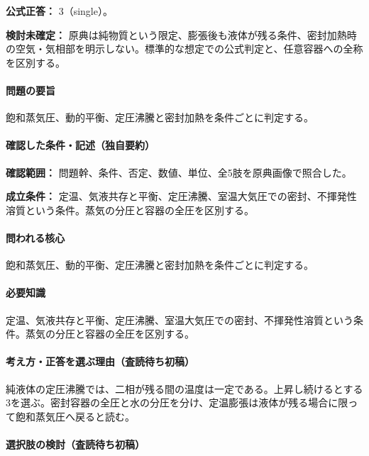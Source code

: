 \textbf{公式正答：} 3（single）。

\par\textbf{検討未確定：} 原典は純物質という限定、膨張後も液体が残る条件、密封加熱時の空気・気相部を明示しない。標準的な想定での公式判定と、任意容器への全称を区別する。

\paragraph{問題の要旨} 飽和蒸気圧、動的平衡、定圧沸騰と密封加熱を条件ごとに判定する。

\paragraph{確認した条件・記述（独自要約）}\mbox{}\par

\noindent\textbf{確認範囲：} 問題幹、条件、否定、数値、単位、全5肢を原典画像で照合した。\par

\noindent\textbf{成立条件：} 定温、気液共存と平衡、定圧沸騰、室温大気圧での密封、不揮発性溶質という条件。蒸気の分圧と容器の全圧を区別する。\par

\paragraph{問われる核心} 飽和蒸気圧、動的平衡、定圧沸騰と密封加熱を条件ごとに判定する。

\paragraph{必要知識} 定温、気液共存と平衡、定圧沸騰、室温大気圧での密封、不揮発性溶質という条件。蒸気の分圧と容器の全圧を区別する。

\paragraph{考え方・正答を選ぶ理由（査読待ち初稿）} 純液体の定圧沸騰では、二相が残る間の温度は一定である。上昇し続けるとする3を選ぶ。密封容器の全圧と水の分圧を分け、定温膨張は液体が残る場合に限って飽和蒸気圧へ戻ると読む。

\paragraph{選択肢の検討（査読待ち初稿）}\mbox{}\par

